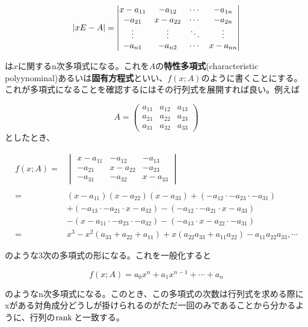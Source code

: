 \documentclass[dvipdfmx,autodetect-engine]{jsarticle}
\theoremstyle{definition}
\newcommand{\rank}[1]{{\rm rank}\,#1}
\DeclarePairedDelimiter{\abs}{\lvert}{\rvert}
\begin{document}
$$
\abs{xE - A} = \begin{vmatrix}
x - a_{11} & -a_{12} & \cdots & - a_{1n} \\
 - a_{21} & x-a_{22} & \cdots & - a_{2n} \\
\vdots     & \vdots  & \ddots & \vdots \\
 - a_{n1} & -a_{n2} & \cdots & x - a_{nn}
\end{vmatrix}
$$

は$x$に関するn次多項式になる。これを$A$の{\bf 特性多項式}(characteristic polyynominal)あるいは{\bf 固有方程式}といい、$f(x;A)$のように書くことにする。これが多項式になることを確認するにはその行列式を展開すれば良い。例えば

$$
A = \begin{pmatrix}
a_{11} & a_{12} & a_{13} \\ 
a_{21} & a_{22} & a_{23} \\ 
a_{31} & a_{32} & a_{33}
\end{pmatrix}
$$としたとき、

\begin{equation}
\begin{split}
    f(x;A) 
    ={}&
    \begin{vmatrix}
    x - a_{11} & - a_{12} & -a_{13} \\ 
    -a_{21} & x - a_{22} & -a_{23} \\ 
    -a_{31} & -a_{32} & x - a_{33}
    \end{vmatrix} \\
    \\={}&
    (x - a_{11})(x - a_{22})(x - a_{33}) + (-a_{12} \cdot -a_{23} \cdot -a_{31})
    \\&+
    (-a_{13} \cdot -a_{21} \cdot x - a_{32}) - (-a_{12} \cdot -a_{21} \cdot x - a_{33})
    \\&-(x - a_{11} \cdot  -a_{23} \cdot -a_{32}) - (- a_{13} \cdot x - a_{22} \cdot - a_{31})
    \\={}&x^3 - x^2(a_{33} + a_{22} + a_{11}) + x(a_{22}a_{33} + a_{11}a_{22}) - a_{11}a_{22}a_{33}, \cdots
\end{split}
\end{equation}

のような3次の多項式の形になる。これを一般化すると

$$
f(x;A) = a_0x^n + a_1x^{n-1} + \cdots + a_n
$$

のようなn次多項式になる。このとき、この多項式の次数は行列式を求める際にxがある対角成分どうしが掛けられるのがただ一回のみであることから分かるように、行列の$\rank$と一致する。
\end{document}
